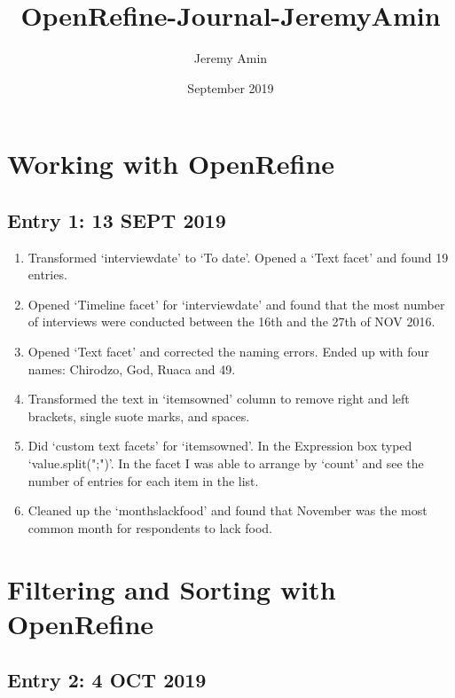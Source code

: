 \documentclass{article}
\title{OpenRefine-Journal-JeremyAmin}
\author{Jeremy Amin}
\date{September 2019}
\begin{document}
\maketitle

\section{Working with OpenRefine}

\subsection{Entry 1: 13 SEPT 2019}

\begin{enumerate}
\item Transformed `interview\textunderscore date' to `To date'. Opened a `Text facet' and found 19 entries.
\item Opened `Timeline facet' for `interview\textunderscore date' and found that the most number of interviews were conducted between the 16th and the 27th of NOV 2016.
\item Opened `Text facet' and corrected the naming errors. Ended up with four names: Chirodzo, God, Ruaca and 49.
\item Transformed the text in `items\textunderscore owned' column to remove right and left brackets, single suote marks, and spaces.
\item Did `custom text facets' for `items\textunderscore owned'. In the Expression box  typed `value.split(";")'. In the facet I was able to arrange by `count' and see the number of entries for each item in the list.
\item Cleaned up the `months\textunderscore lack\textunderscore food' and found that November was the most common month for respondents to lack food.
\end{enumerate}

\section{Filtering and Sorting with OpenRefine}
\subsection{Entry 2: 4 OCT 2019}
\end{document}
